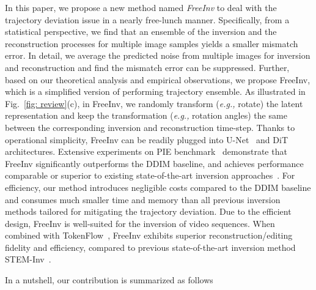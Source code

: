 \documentclass{article}
\begin{document}
In this paper, we propose a new method named \textit{FreeInv} to deal with the trajectory deviation issue in a nearly free-lunch manner.
Specifically, from a statistical perspective, we find that an ensemble of the inversion and the reconstruction processes for multiple image samples yields a smaller mismatch error. 
In detail, we average the predicted noise from multiple images for inversion and reconstruction and find the mismatch error can be suppressed.
Further, based on our theoretical analysis and empirical observations, we propose FreeInv, which is a simplified version of performing trajectory ensemble.
As illustrated in Fig.~\ref{fig: review}(c), in FreeInv, we randomly transform (\emph{e.g.,} rotate) the latent representation and keep the transformation (\emph{e.g.,} rotation angles) the same between the corresponding inversion and reconstruction time-step. 
Thanks to operational simplicity, FreeInv can be readily plugged into U-Net~\cite{ho2020denoising, rombach2022high} and DiT~\cite{peebles2023scalable, flux, esser2024scaling} architectures. 
Extensive experiments on PIE benchmark~\cite{ju2024pnp} demonstrate that FreeInv significantly outperforms the DDIM baseline, and achieves performance comparable or superior to existing state-of-the-art inversion approaches~\cite{mokady2022null, wallace2023edict, wang2024belm, xu2023inversion, ju2024pnp, huberman2024edit, garibi2024renoise, wang2024taming}.
For efficiency, our method introduces negligible costs compared to the DDIM baseline and consumes much smaller time and memory than all previous inversion methods tailored for mitigating the trajectory deviation.
Due to the efficient design, FreeInv is well-suited for the inversion of video sequences.
When combined with TokenFlow~\cite{geyer2023tokenflow}, FreeInv exhibits superior reconstruction/editing fidelity and efficiency, compared to previous state-of-the-art inversion method STEM-Inv~\cite{li2024video}.


In a nutshell, our contribution is summarized as follows
\end{document}
